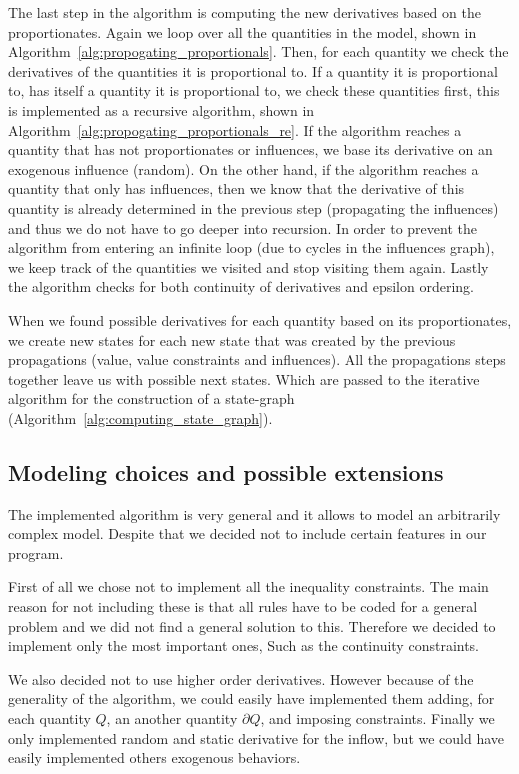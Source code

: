 \documentclass[a4paper]{article}
\begin{document}
The last step in the algorithm is computing the new derivatives based on the proportionates. Again we loop over all the quantities in the model, shown in Algorithm~\ref{alg:propogating_proportionals}. Then, for each quantity we check the derivatives of the quantities it is proportional to. If a quantity it is proportional to, has itself a quantity it is proportional to, we check these quantities first, this is implemented as a recursive algorithm, shown in Algorithm~\ref{alg:propogating_proportionals_re}. If the algorithm reaches a quantity that has not proportionates or influences, we base its derivative on an exogenous influence (random). On the other hand, if the algorithm reaches a quantity that only has influences, then we know that the derivative of this quantity is already determined in the previous step (propagating the influences) and thus we do not have to go deeper into recursion. In order to prevent the algorithm from entering an infinite loop (due to cycles in the influences graph), we keep track of the quantities we visited and stop visiting them again. Lastly the algorithm checks for both continuity of derivatives and epsilon ordering.

When we found possible derivatives for each quantity based on its proportionates, we create new states for each new state that was created by the previous propagations (value, value constraints and influences). All the propagations steps together leave us with possible next states. Which are passed to the iterative algorithm for the construction of a state-graph (Algorithm~\ref{alg:computing_state_graph}).

\subsection{Modeling choices and possible extensions}
The implemented algorithm is very general and it allows to model an arbitrarily complex model. Despite that we decided not to include certain features in our program.

First of all we chose not to implement all the inequality constraints. The main reason for not including these is that all rules have to be coded for a general problem and we did not find a general solution to this. Therefore we decided to implement only the most important ones, Such as the continuity constraints.

We also decided not to use higher order derivatives. However because of the generality of the algorithm, we could easily have implemented them adding, for each quantity $Q$, an another quantity $\partial Q$, and imposing constraints.
Finally we only implemented random and static derivative for the inflow, but we could have easily implemented others exogenous behaviors.
\end{document}
